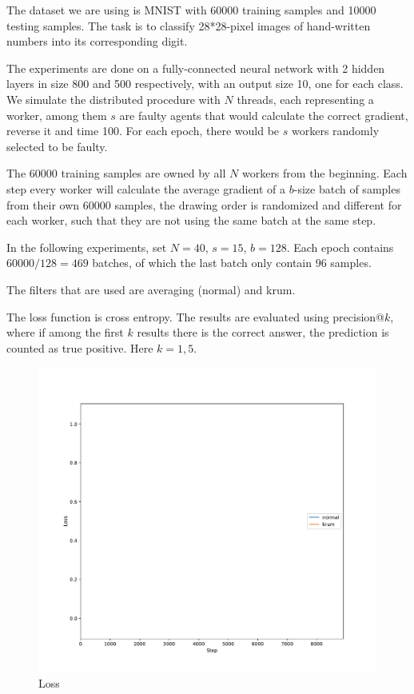 \documentclass[10pt]{article}
\begin{document}
\large
The dataset we are using is MNIST with 60000 training samples and 10000 testing samples. The task is to classify 28*28-pixel images of hand-written numbers into its corresponding digit.

The experiments are done on a fully-connected neural network with 2 hidden layers in size 800 and 500 respectively, with an output size 10, one for each class. We simulate the distributed procedure with $N$ threads, each representing a worker, among them $s$ are faulty agents that would calculate the correct gradient, reverse it and time 100. For each epoch, there would be $s$ workers randomly selected to be faulty. 

The 60000 training samples are owned by all $N$ workers from the beginning. Each step every worker will calculate the average gradient of a $b$-size batch of samples from their own $60000$ samples, the drawing order is randomized and different for each worker, such that they are not using the same batch at the same step. 

In the following experiments, set $N=40$, $s=15$, $b=128$. Each epoch contains $60000/128=469$ batches, of which the last batch only contain $96$ samples.

The filters that are used are averaging (normal) and krum. %

The loss function is cross entropy. The results are evaluated using precision@$k$, where if among the first $k$ results there is the correct answer, the prediction is counted as true positive. Here $k=1,5$.

\begin{figure}[h]
	\centering
	\includegraphics[width=.8\textwidth]{loss-10000.pdf}
	\caption{Loss}
\end{figure}
\end{document}
